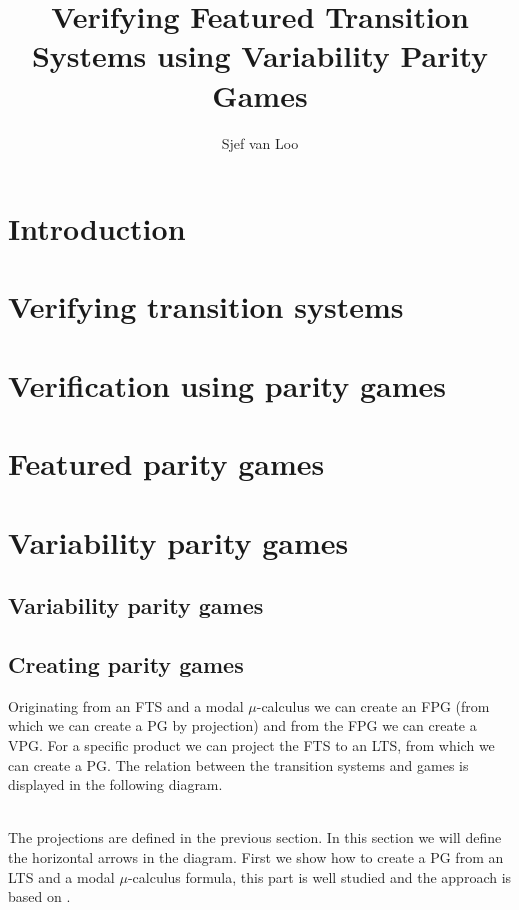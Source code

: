 \documentclass[]{article}
\title{Verifying Featured Transition Systems using Variability Parity Games}
\author{Sjef van Loo}
\begin{document}
\maketitle

\tableofcontents

\section{Introduction}


\section{Verifying transition systems}


\section{Verification using parity games}


\section{Featured parity games}


\section{Variability parity games}


\subsection{Variability parity games}


\subsection{Creating parity games}
Originating from an FTS and a modal $\mu$-calculus we can create an FPG (from which we can create a PG by projection) and from the FPG we can create a VPG. For a specific product we can project the FTS to an LTS, from which we can create a PG. The relation between the transition systems and games is displayed in the following diagram.
\\\\
The projections are defined in the previous section. In this section we will define the horizontal arrows in the diagram. First we show how to create a PG from an LTS and a  modal $\mu$-calculus formula, this part is well studied and the approach is based on \cite{Bradfield2018}.
\end{document}
